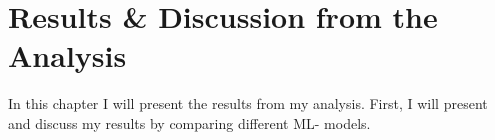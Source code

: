 \chapter{Results \& Discussion from the Analysis}\label{subsec:ResDisc}
In this chapter I will present the results from my analysis. First,
I will present and discuss my results by comparing different \ac{ML}-
models.  

